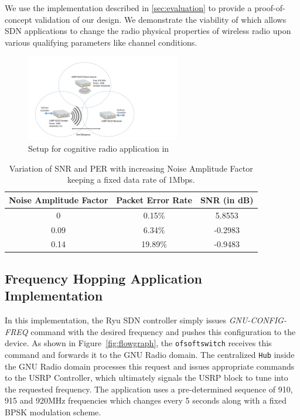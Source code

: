 We use the \crossflow implementation described in \ref{sec:evaluation} to provide a proof-of-concept validation of our design. We demonstrate the viability of \crossflow which  allows SDN applications to change the radio physical properties of wireless radio upon various qualifying parameters like channel conditions. 

\begin{figure}[t]
  \centering
  \includegraphics[width=0.6\textwidth]{figures/Setup.pdf}
  \caption{Setup for cognitive radio application in \crossflow}
  \label{fig:setup}
\end{figure}


\begin{table}[]
\centering
\caption{Variation of SNR and PER with increasing Noise Amplitude Factor keeping a fixed data rate of 1Mbps.}
\label{my-label}
\begin{tabular}{@{}|c|c|c|@{}}
\toprule
Noise Amplitude Factor & Packet Error Rate & SNR (in dB) \\ \midrule
0                      & 0.15\%            & 5.8553                     \\ \midrule
0.09                   & 6.34\%            & -0.2983                    \\ \midrule
0.14                   & 19.89\%           & -0.9483                    \\ \bottomrule
\end{tabular}
 \label{fig:table}
\end{table}

\subsection{Frequency Hopping Application Implementation}

In this implementation,  the Ryu SDN controller simply issues \emph{GNU-CONFIG-FREQ} command with the desired frequency and pushes this configuration to the device. As shown in Figure~\ref{fig:flowgraph}, the \texttt{ofsoftswitch} receives this command and forwards it to the GNU Radio domain. The centralized \texttt{\crossflow Hub} inside the GNU Radio domain processes this request and issues appropriate commands to the  USRP Controller, which ultimately signals the USRP block to tune into the requested frequency. The application uses a pre-determined sequence of 910, 915 and 920MHz frequencies which changes every 5 seconds along with a fixed BPSK modulation scheme.


